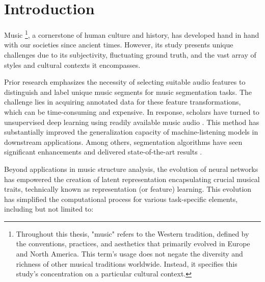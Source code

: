 \chapter{Introduction}

Music \footnote{Throughout this thesis, "music" refers to the Western tradition, defined by the conventions, practices, and aesthetics that primarily evolved in Europe and North America. This term's usage does not negate the diversity and richness of other musical traditions worldwide. Instead, it specifies this study's concentration on a particular cultural context.}, a cornerstone of human culture and history, has developed hand in hand with our societies since ancient times. However, its study presents unique challenges due to its subjectivity, fluctuating ground truth, and the vast array of styles and cultural contexts it encompasses.

Prior research emphasizes the necessity of selecting suitable audio features to distinguish and label unique music segments for music segmentation tasks. The challenge lies in acquiring annotated data for these feature transformations, which can be time-consuming and expensive. In response, scholars have turned to unsupervised deep learning using readily available music audio \cite{deepfeaturesegment, Grill2015MusicAnnotations}. This method has substantially improved the generalization capacity of machine-listening models in downstream applications. Among others, segmentation algorithms have seen significant enhancements and delivered state-of-the-art results \cite{Hernandez-Olivan2021MusicFeatures, Li2023MERT:Training}.

Beyond applications in music structure analysis, the evolution of neural networks has empowered the creation of latent representation encapsulating crucial musical traits, technically known as representation (or feature) learning. This evolution has simplified the computational process for various task-specific elements, including but not limited to:

